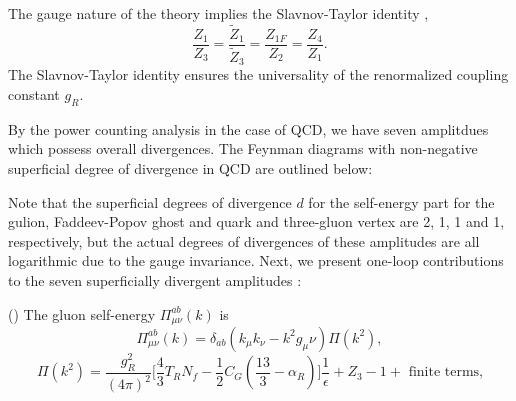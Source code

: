 The gauge nature of the theory implies the Slavnov-Taylor identity \cite{Tay71,Sla73}, 
\begin{equation}
\frac{Z_1}{Z_3}=\frac{\widetilde{Z}_1}{\widetilde{Z}_3}=\frac{Z_{1F}}{Z_2}=\frac{Z_4}{Z_1}.
\end{equation} 
The Slavnov-Taylor identity ensures the universality of the renormalized coupling constant $g_R$.

By the power counting analysis in the case of QCD, we have seven amplitdues which possess overall divergences. The Feynman diagrams with non-negative superficial degree of divergence in QCD are outlined below:

Note that the superficial degrees of divergence $d$ for the self-energy part for the gulion, Faddeev-Popov ghost and quark and three-gluon vertex are 2, 1, 1 and 1, respectively, but the actual degrees of divergences of these amplitudes are all logarithmic due to the gauge invariance. Next, we present one-loop contributions to the seven superficially divergent amplitudes \cite{Muta,Cel79,Pas80}:



() The gluon self-energy $\Pi^{ab}_{\mu\nu}(k)$ is
\begin{equation}
\Pi^{ab}_{\mu\nu}(k)=\delta_{ab}(k_\mu k_\nu-k^2g_\mu\nu)\Pi(k^2),
\end{equation}
\begin{equation}
\Pi(k^2)=\frac{g^2_R}{(4\pi)^2}\biggl[\frac{4}{3}T_RN_f-\frac{1}{2}C_G\left(\frac{13}{3}-\alpha_R \right) \biggr]\frac{1}{\epsilon}+Z_3-1+\text{ finite terms,}
\end{equation}
\def\GLSE1{
	\raisebox{-38.2pt}{
		\begin{axopicture}(100,60)
			\Gluon(5,37)(30,37){3}{3}
			\Gluon(70,37)(95,37){3}{3}
			\GCirc(50,37){20}{0.67}
		\end{axopicture}
		
	}
}	

\def\gGLSE{
	\raisebox{-38.2pt}{
		\begin{axopicture}(100,60)
			\Gluon(5,37)(30,37){3}{3}
			\Gluon(70,37)(95,37){3}{3}
			\GluonArc(50,37)(20,0,360){3}{10}
		\end{axopicture}
		
	}
}	


\def\ggGLSE{
	\raisebox{-38.2pt}{
		\begin{axopicture}(100,60)
			\Gluon(5,37)(50,37){3}{4}
			\Gluon(50,37)(95,37){3}{4}
			\GluonArc(50,60)(20,0,180){3}{5}
			\GluonArc(50,60)(20,180,360){3}{5}
		\end{axopicture}
		
	}
}		


